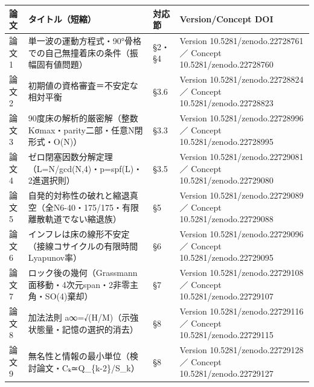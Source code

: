 \documentclass[
  a4paper,
]{ltjsarticle}
\newcounter{none} %
\begin{document}
{\def\LTcaptype{none} %
\begin{longtable}[]{@{}
  >{\raggedright\arraybackslash}p{}
  >{\raggedright\arraybackslash}p{}
  >{\raggedright\arraybackslash}p{}
  >{\raggedright\arraybackslash}p{}@{}}
\toprule\noalign{}
\begin{minipage}[b]{\linewidth}\raggedright
論文
\end{minipage} & \begin{minipage}[b]{\linewidth}\raggedright
タイトル（短縮）
\end{minipage} & \begin{minipage}[b]{\linewidth}\raggedright
対応節
\end{minipage} & \begin{minipage}[b]{\linewidth}\raggedright
Version/Concept DOI
\end{minipage} \\
\midrule\noalign{}
\endhead
\bottomrule\noalign{}
\endlastfoot
論文1 &
単一波の運動方程式・90°骨格での自己無撞着床の条件（振幅固有値問題） &
§2・§4 & Version 10.5281/zenodo.22728761 ／ Concept
10.5281/zenodo.22728760 \\
論文2 & 初期値の資格審査＝不安定な相対平衡 & §3.6 & Version
10.5281/zenodo.22728824 ／ Concept 10.5281/zenodo.22728823 \\
論文3 & 90度床の解析的厳密解（整数Kσmax・parity二部・任意N閉形式・O(N)）
& §3.3 & Version 10.5281/zenodo.22728996 ／ Concept
10.5281/zenodo.22728995 \\
論文4 & ゼロ閉塞因数分解定理（L=N/gcd(N,4)・p=spf(L)・2進選択則） & §3.5
& Version 10.5281/zenodo.22729081 ／ Concept 10.5281/zenodo.22729080 \\
論文5 &
自発的対称性の破れと縮退真空（全N6-40・175/175・有限離散軌道でない縮退族）
& §5 & Version 10.5281/zenodo.22729089 ／ Concept
10.5281/zenodo.22729088 \\
論文6 & インフレは床の線形不安定（接線コサイクルの有限時間Lyapunov率） &
§6 & Version 10.5281/zenodo.22729096 ／ Concept
10.5281/zenodo.22729095 \\
論文7 &
ロック後の幾何（Grassmann面移動・4次元span・2非零主角・SO(4)棄却） & §7
& Version 10.5281/zenodo.22729108 ／ Concept 10.5281/zenodo.22729107 \\
論文8 & 加法法則 a∞=√(H/M)（示強状態量・記憶の選択的消去） & §8 &
Version 10.5281/zenodo.22729116 ／ Concept 10.5281/zenodo.22729115 \\
論文9 & 無名性と情報の最小単位（検討論文・Cₖ≃Q\_\{k-2\}/S\_k） & §8 &
Version 10.5281/zenodo.22729128 ／ Concept 10.5281/zenodo.22729127 \\
\end{longtable}
}
\end{document}
